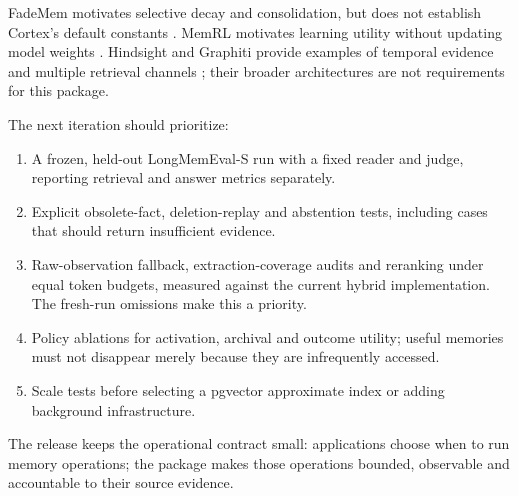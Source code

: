 \documentclass[11pt]{article}
\begin{document}
FadeMem motivates selective decay and consolidation, but does not establish Cortex's default constants \cite{fade}. MemRL motivates learning utility without updating model weights \cite{memrl}. Hindsight and Graphiti provide examples of temporal evidence and multiple retrieval channels \cite{hindsight,graphiti}; their broader architectures are not requirements for this package.

The next iteration should prioritize:
\begin{enumerate}
\item A frozen, held-out LongMemEval-S run with a fixed reader and judge, reporting retrieval and answer metrics separately.
\item Explicit obsolete-fact, deletion-replay and abstention tests, including cases that should return insufficient evidence.
\item Raw-observation fallback, extraction-coverage audits and reranking under equal token budgets, measured against the current hybrid implementation. The fresh-run omissions make this a priority.
\item Policy ablations for activation, archival and outcome utility; useful memories must not disappear merely because they are infrequently accessed.
\item Scale tests before selecting a pgvector approximate index or adding background infrastructure.
\end{enumerate}

The release keeps the operational contract small: applications choose when to run memory operations; the package makes those operations bounded, observable and accountable to their source evidence.
\end{document}
